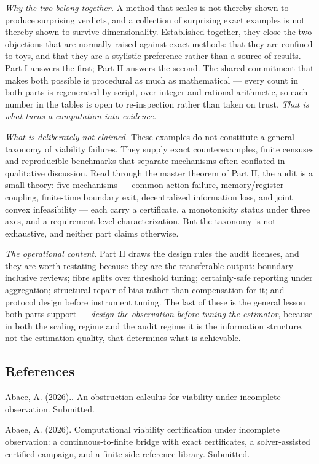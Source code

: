 \documentclass[10pt,twocolumn]{article}
\theoremstyle{plain}
\theoremstyle{definition}
\theoremstyle{remark}
\begin{document}
\emph{Why the two belong together.} A method that scales is not thereby shown to produce
surprising verdicts, and a collection of surprising exact examples is not thereby shown to survive
dimensionality. Established together, they close the two objections that are normally raised
against exact methods: that they are confined to toys, and that they are a stylistic preference
rather than a source of results. Part I answers the first; Part II answers the second. The shared
commitment that makes both possible is procedural as much as mathematical --- every count in both
parts is regenerated by script, over integer and rational arithmetic, so each number in the tables
is open to re-inspection rather than taken on trust. \emph{That is what turns a computation into
evidence.}

\emph{What is deliberately not claimed.} These examples do not constitute a general taxonomy of
viability failures. They supply exact counterexamples, finite censuses and reproducible benchmarks
that separate mechanisms often conflated in qualitative discussion. Read through the master theorem
of Part II, the audit is a small theory: five mechanisms --- common-action failure,
memory/register coupling, finite-time boundary exit, decentralized information loss, and joint
convex infeasibility --- each carry a certificate, a monotonicity status under three axes, and a
requirement-level characterization. But the taxonomy is not exhaustive, and neither part claims
otherwise.

\emph{The operational content.} Part II draws the design rules the audit licenses, and they are
worth restating because they are the transferable output: boundary-inclusive reviews; fibre splits
over threshold tuning; certainly-safe reporting under aggregation; structural repair of bias rather
than compensation for it; and protocol design before instrument tuning. The last of these is the
general lesson both parts support --- \emph{design the observation before tuning the estimator},
because in both the scaling regime and the audit regime it is the information structure, not the
estimation quality, that determines what is achievable.

\subsection*{References}
\label{references}
Abaee, A. (2026).. An obstruction calculus for viability under incomplete observation. Submitted.

Abaee, A. (2026). Computational viability certification under incomplete
observation: a continuous-to-finite bridge with exact certificates, a
solver-assisted certified campaign, and a finite-side reference library.
Submitted.
\end{document}
